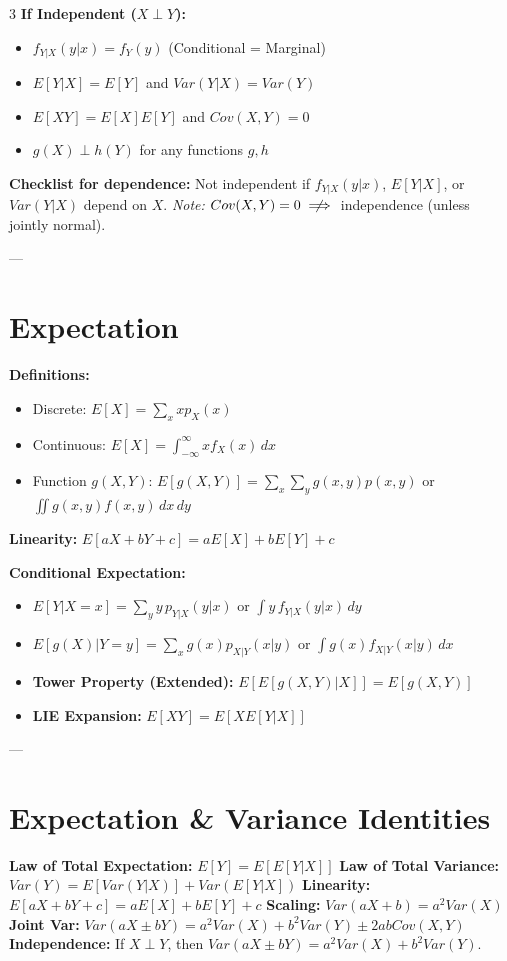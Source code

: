 \documentclass[10pt]{article}
\begin{document}
\begin{multicols}{3}
\textbf{If Independent ($X \perp Y$):}
\begin{itemize}
    \item $f_{Y|X}(y|x) = f_Y(y)$ (Conditional = Marginal)
    \item $E[Y|X] = E[Y]$ and $Var(Y|X) = Var(Y)$
    \item $E[XY]=E[X]E[Y]$ and $Cov(X,Y)=0$
    \item $g(X) \perp h(Y)$ for any functions $g, h$
\end{itemize}

\textbf{Checklist for dependence:} Not independent if $f_{Y|X}(y|x)$, $E[Y|X]$, or $Var(Y|X)$ depend on $X$.
\quad \textit{Note:} $Cov(X,Y)=0 \centernot\implies$ independence (unless jointly normal).

---

\section*{Expectation}
\textbf{Definitions:}
\begin{itemize}
    \item Discrete: $E[X]=\sum_x x p_X(x)$
    \item Continuous: $E[X]=\int_{-\infty}^{\infty} x f_X(x)\,dx$
    \item Function $g(X,Y)$: $E[g(X,Y)]=\sum_x \sum_y g(x,y)p(x,y)$ or $\iint g(x,y)f(x,y)\,dx\,dy$
\end{itemize}

\textbf{Linearity:} $E[aX+bY+c]=aE[X]+bE[Y]+c$

\textbf{Conditional Expectation:}
\begin{itemize}
    \item $E[Y|X=x]=\sum_y y\,p_{Y|X}(y|x)$ or $\int y\,f_{Y|X}(y|x)\,dy$
    \item $E[g(X)|Y=y] = \sum_x g(x)p_{X|Y}(x|y)$ or $\int g(x)f_{X|Y}(x|y) \, dx$
    \item \textbf{Tower Property (Extended):} $E[E[g(X,Y)|X]] = E[g(X,Y)]$
    \item \textbf{LIE Expansion:} $E[XY] = E[ X E[Y|X] ]$
\end{itemize}

---

\section*{Expectation \& Variance Identities}
\textbf{Law of Total Expectation:} $E[Y]=E[E[Y|X]]$
\textbf{Law of Total Variance:} $Var(Y)=E[Var(Y|X)]+Var(E[Y|X])$
\textbf{Linearity:} $E[aX+bY+c]=aE[X]+bE[Y]+c$
\textbf{Scaling:} $Var(aX+b)=a^2Var(X)$
\textbf{Joint Var:} $Var(aX \pm bY)=a^2Var(X)+b^2Var(Y) \pm 2abCov(X,Y)$
\textbf{Independence:} If $X \perp Y$, then $Var(aX \pm bY)=a^2Var(X)+b^2Var(Y)$.


\end{multicols}
\end{document}
